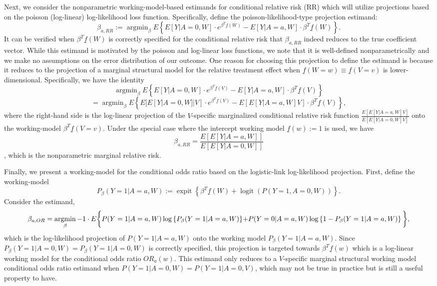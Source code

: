 \documentclass[
]{jss}
\DeclareMathOperator{\logit}{logit}
\DeclareMathOperator{\argmin}{argmin}
\DeclareMathOperator{\expit}{expit}
\begin{document}
Next, we consider the nonparametric working-model-based estimands for
conditional relative risk (RR) which will utilize projections based on
the poisson (log-linear) log-likelihood loss function. Specifically,
define the poisson-likelihood-type projection estimand: \begin{equation}
\beta_{a,RR} := \argmin_{\beta} E \left\{E[Y|A=0,W] \cdot e^{\beta^T \underline{f}(W)} - E[Y|A=a,W] \cdot \beta^T \underline{f}(W) \right\}.
\end{equation} It can be verified when \(\beta^T \underline{f}(W)\) is
correctly specified for the conditional relative risk that
\(\beta_{a,RR}\) indeed reduces to the true coefficient vector. While
this estimand is motivated by the poisson and log-linear loss functions,
we note that it is well-defined nonparametrically and we make no
assumptions on the error distribution of our outcome. One reason for
choosing this projection to define the estimand is because it reduces to
the projection of a marginal structural model for the relative treatment
effect when \(\underline{f}(W=w) \equiv \underline{f}(V=v)\) is
lower-dimensional. Specifically, we have the identity
\[\argmin_{\beta} E \left\{E[Y|A=0,W] \cdot e^{\beta^T \underline{f}(V)} - E[Y|A=a,W] \cdot \beta^T \underline{f}(V) \right\}\]
\[= \argmin_{\beta} E \left\{E[E[Y|A=0,W]|V] \cdot e^{\beta^T \underline{f}(V)} - E[E[Y|A=a,W]V] \cdot \beta^T \underline{f}(V) \right\},\]
where the right-hand side is the log-linear projection of the
\(V\)-specific marginalized conditional relative risk function
\(\frac{E[E[Y|A=a,W]V]}{E[E[Y|A=0,W]V]}\) onto the working-model
\(\beta^T \underline{f}(V=v)\). Under the special case where the
intercept working model \(\underline{f}(w) := 1\) is used, we have
\[\beta_{a,RR} = \frac{E[E[Y|A=a,W]]}{E[E[Y|A=0,W]]}\], which is the
nonparametric marginal relative risk.

Finally, we present a working-model for the conditional odds ratio based
on the logistic-link log-likelihood projection. First, define the
working-model
\[P_{\beta}(Y=1|A=a,W) :=  \expit\left\{\beta^T \underline{f}(W)  + \logit(P(Y=1,A=0,W))\right\}.\]
Consider the estimand, \begin{equation}
\beta_{a,OR} = \argmin_{\beta} -1 \cdot E\bigg\{P(Y=1|A=a,W)\log \left\{P_{\beta}(Y=1|A=a,W)\right\} $$
$$+ P(Y=0|A=a,W)\log \left\{1-P_{\beta}(Y=1|A=a,W)\right\} \bigg\},
\end{equation} which is the log-likelihood projection of
\(P(Y=1|A=a,W)\) onto the working model \(P_{\beta}(Y=1|A=a,W)\). Since
\(P_{\beta}(Y=1|A=0,W) = P_{\beta}(Y=1|A=0,W)\) is correctly specified,
this projection is targeted towards \(\beta^T \underline{f}(w)\) which
is a log-linear working model for the conditional odds ratio
\(OR_a(w)\). This estimand only reduces to a \(V\)-specific marginal
structural working model conditional odds ratio estimand when
\(P(Y=1|A=0,W) = P(Y=1|A=0,V)\), which may not be true in practice but
is still a useful property to have.
\end{document}
